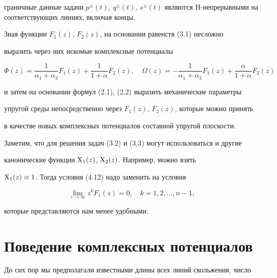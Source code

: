 граничные данные задачи $p^\pm(t)$, $q^\pm(t)$, $s^\pm(t)$ являются $\mathrm 


H$-непрерывными на соответствующих линиях, включая концы. 


 


Зная функции $F_1(z)$, $F_2(z)$, на основании равенств (3.1) несложно 


выразить через них искомые комплексные потенциалы 


\begin{equation} 


\Phi(z)=\frac{1}{\alpha_1+\alpha_3}F_1(z)+\frac{1}{1+\alpha} 


F_2(z),\quad \Omega(z)=-\frac{1}{\alpha_1+\alpha_3}F_1(z)+ 


\frac{\alpha}{1+\alpha}F_2(z) 


\end{equation} 


и затем на основании формул (2.1), (2.2) выразить механические параметры 


упругой среды непосредственно через $F_1(z)$, $F_2(z)$, которые можно принять 


в качестве новых комплексных потенциалов составной упругой плоскости. 


 


Заметим, что для решения задач (3.2) и (3.3) могут использоваться и другие 


канонические функции $\mathrm X_1(z)$, $\mathrm X_2(z)$. Например, можно взять 


$\mathrm X_1(z)\equiv1$. Тогда условия (4.12) надо заменить на условия 


$$ 


\lim_{z\to\infty}z^k F_1(z)=0,\quad k=1,2,\dotsc,n-1, 


$$ 


которые представляются нам менее удобными. 


 


 


\section{Поведение комплексных потенциалов} 


 


До сих пор мы предполагали известными длины всех линий скольжения, число 


